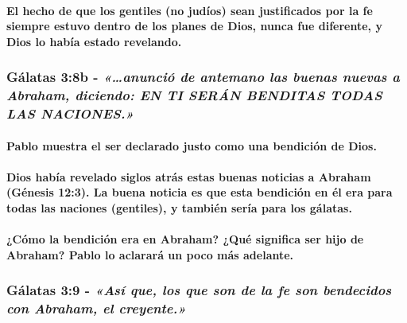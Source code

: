 \documentclass[11a pt,twoside]{article}
\newcommand{\scripture}[1]{%
  {\fontsize{12pt}{16pt}\selectfont\ScriptureFont\itshape #1}%
}
\let\oldsubsubsection\subsubsection
\renewcommand{\subsubsection}{\needspace{4\baselineskip}\oldsubsubsection}
\let\oldparagraph\paragraph
\renewcommand{\paragraph}{\needspace{3\baselineskip}\oldparagraph}
\begin{document}
\paragraph{El hecho de que los gentiles (no judíos) sean justificados
por la fe siempre estuvo dentro de los planes de Dios, nunca fue
diferente, y Dios lo había estado
revelando.}\label{el-hecho-de-que-los-gentiles-no-juduxedos-sean-justificados-por-la-fe-siempre-estuvo-dentro-de-los-planes-de-dios-nunca-fue-diferente-y-dios-lo-habuxeda-estado-revelando.}

\subsubsection{\texorpdfstring{Gálatas 3:8b -
\scripture{«…anunció de antemano las buenas nuevas a Abraham, diciendo: EN TI SERÁN BENDITAS TODAS LAS NACIONES.»}}{Gálatas 3:8b - }}\label{guxe1latas-38b---anunciuxf3-de-antemano-las-buenas-nuevas-a-abraham-diciendo-en-ti-seruxe1n-benditas-todas-las-naciones.}

\paragraph{Pablo muestra el ser declarado justo como una bendición de
Dios.}\label{pablo-muestra-el-ser-declarado-justo-como-una-bendiciuxf3n-de-dios.}

\paragraph{Dios había revelado siglos atrás estas buenas noticias a
Abraham (Génesis 12:3). La buena noticia es que esta bendición en él era
para todas las naciones (gentiles), y también sería para los
gálatas.}\label{dios-habuxeda-revelado-siglos-atruxe1s-estas-buenas-noticias-a-abraham-guxe9nesis-123.-la-buena-noticia-es-que-esta-bendiciuxf3n-en-uxe9l-era-para-todas-las-naciones-gentiles-y-tambiuxe9n-seruxeda-para-los-guxe1latas.}

\paragraph{¿Cómo la bendición era en Abraham? ¿Qué significa ser hijo de
Abraham? Pablo lo aclarará un poco más
adelante.}\label{cuxf3mo-la-bendiciuxf3n-era-en-abraham-quuxe9-significa-ser-hijo-de-abraham-pablo-lo-aclararuxe1-un-poco-muxe1s-adelante.}

\subsubsection{\texorpdfstring{Gálatas 3:9 -
\scripture{«Así que, los que son de la fe son bendecidos con Abraham, el creyente.»}}{Gálatas 3:9 - }}\label{guxe1latas-39---asuxed-que-los-que-son-de-la-fe-son-bendecidos-con-abraham-el-creyente.}
\end{document}
